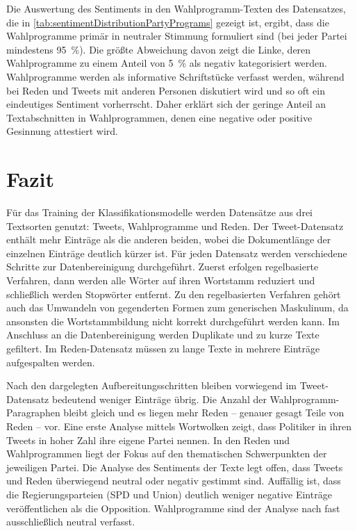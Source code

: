 Die Auswertung des Sentiments in den Wahlprogramm-Texten des Datensatzes, die in \autoref{tab:sentimentDistributionPartyPrograms} gezeigt ist, ergibt, dass die Wahlprogramme primär in neutraler Stimmung formuliert sind (bei jeder Partei mindestens \SI{95}{\percent}). Die größte Abweichung davon zeigt die Linke, deren Wahlprogramme zu einem Anteil von \SI{5}{\percent} als negativ kategorisiert werden. Wahlprogramme werden als informative Schriftstücke verfasst werden, während bei Reden und Tweets mit anderen Personen diskutiert wird und so oft ein eindeutiges Sentiment vorherrscht. Daher erklärt sich der geringe Anteil an Textabschnitten in Wahlprogrammen, denen eine negative oder positive Gesinnung attestiert wird.

\section{Fazit} \label{sec:crispConclusion_1}

Für das Training der Klassifikationsmodelle werden Datensätze aus drei Textsorten genutzt: Tweets, Wahlprogramme und Reden. Der Tweet-Datensatz enthält mehr Einträge als die anderen beiden, wobei die Dokumentlänge der einzelnen Einträge deutlich kürzer ist. Für jeden Datensatz werden verschiedene Schritte zur Datenbereinigung durchgeführt. Zuerst erfolgen regelbasierte Verfahren, dann werden alle Wörter auf ihren Wortstamm reduziert und schließlich werden Stopwörter entfernt. Zu den regelbasierten Verfahren gehört auch das Umwandeln von gegenderten Formen zum generischen Maskulinum, da ansonsten die Wortstammbildung nicht korrekt durchgeführt werden kann. Im Anschluss an die Datenbereinigung werden Duplikate und zu kurze Texte gefiltert. Im Reden-Datensatz müssen zu lange Texte in mehrere Einträge aufgespalten werden.

Nach den dargelegten Aufbereitungsschritten bleiben vorwiegend im Tweet-Datensatz bedeutend weniger Einträge übrig. Die Anzahl der Wahlprogramm-Paragraphen bleibt gleich und es liegen mehr Reden -- genauer gesagt Teile von Reden -- vor. Eine erste Analyse mittels Wortwolken zeigt, dass Politiker in ihren Tweets in hoher Zahl ihre eigene Partei nennen. In den Reden und Wahlprogrammen liegt der Fokus auf den thematischen Schwerpunkten der jeweiligen Partei. Die Analyse des Sentiments der Texte legt offen, dass Tweets und Reden überwiegend neutral oder negativ gestimmt sind. Auffällig ist, dass die Regierungsparteien (\ac{SPD} und Union) deutlich weniger negative Einträge veröffentlichen als die Opposition. Wahlprogramme sind der Analyse nach fast ausschließlich neutral verfasst.